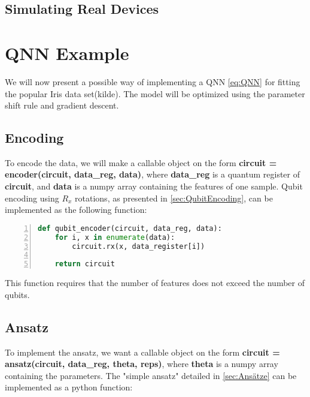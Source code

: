\subsection{Simulating Real Devices}\label{sec:Simulating Real Devices}



\section{QNN Example}\label{sec:QNNimpement}
We will now present a possible way of implementing a QNN \autoref{eq:QNN} for fitting the popular Iris data set(kilde). The model will be optimized using the parameter shift rule and gradient descent. 

\subsection{Encoding}

To encode the data, we will make a callable object on the form \textbf{circuit = encoder(circuit, data\_reg, data)}, where \textbf{data\_reg} is a quantum register of \textbf{circuit}, and \textbf{data} is a numpy array containing the features of one sample. Qubit encoding using $R_x$ rotations, as presented in \autoref{sec:QubitEncoding}, can be implemented as the following function:

\begin{lstlisting}[language=python, numbers=left]
def qubit_encoder(circuit, data_reg, data):
    for i, x in enumerate(data):
        circuit.rx(x, data_register[i])
        
    return circuit
\end{lstlisting}

This function requires that the number of features does not exceed the number of qubits.

\subsection{Ansatz}
To implement the ansatz, we want a callable object on the form 
\textbf{circuit = ansatz(circuit, data\_reg, theta, reps)}, where \textbf{theta} is a numpy array containing the parameters. The "simple ansatz" detailed in \autoref{sec:Ansätze} can be implemented as a python function:

